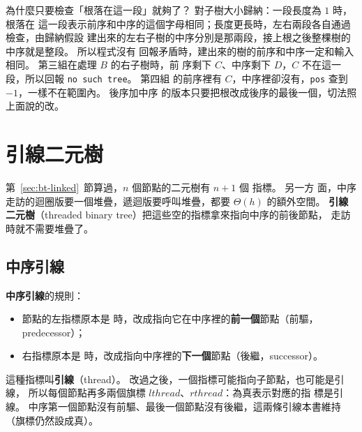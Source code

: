 為什麼只要檢查「根落在這一段」就夠了？ 對子樹大小歸納：一段長度為 $1$ 時，根落在
這一段表示前序和中序的這個字母相同；長度更長時，左右兩段各自通過檢查，由歸納假設
建出來的左右子樹的中序分別是那兩段，接上根之後整棵樹的中序就是整段。 所以程式沒有
回報矛盾時，建出來的樹的前序和中序一定和輸入相同。 第三組在處理 $B$ 的右子樹時，前
序剩下 $C$、中序剩下 $D$，$C$ 不在這一段，所以回報 \texttt{no such tree}。 第四組
的前序裡有 $C$，中序裡卻沒有，\texttt{pos} 查到 $-1$，一樣不在範圍內。 後序加中序
的版本只要把根改成後序的最後一個，切法照上面說的改。

\section{引線二元樹}
\label{sec:bt-thread}

第~\ref{sec:bt-linked}~節算過，$n$ 個節點的二元樹有 $n + 1$ 個 \NIL 指標。 另一方
面，中序走訪的迴圈版要一個堆疊，遞迴版要呼叫堆疊，都要 $\Theta(h)$ 的額外空間。
\textbf{引線二元樹}（threaded binary tree）把這些空的指標拿來指向中序的前後節點，
走訪時就不需要堆疊了。

\subsection{中序引線}

\textbf{中序引線}的規則：
\begin{itemize}
\item 節點的左指標原本是 \NIL 時，改成指向它在中序裡的\textbf{前一個}節點（前驅，
predecessor）；
\item 右指標原本是 \NIL 時，改成指向中序裡的\textbf{下一個}節點（後繼，successor）。
\end{itemize}
這種指標叫\textbf{引線}（thread）。 改過之後，一個指標可能指向子節點，也可能是引線，
所以每個節點再多兩個旗標 $\mathit{lthread}$、$\mathit{rthread}$：為真表示對應的指
標是引線。 中序第一個節點沒有前驅、最後一個節點沒有後繼，這兩條引線本書維持
\NIL（旗標仍然設成真）。

\begin{center}
\label{fig:bt-threads}
\end{center}

